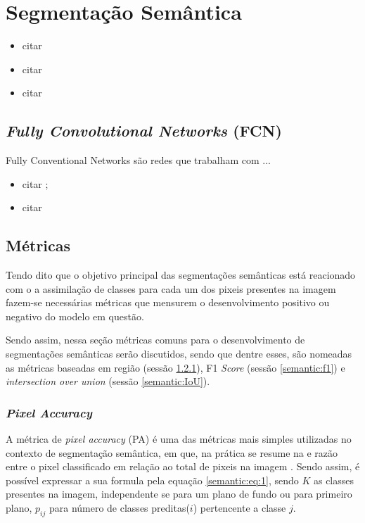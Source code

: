 \clearpage
\newpage
\section{Segmentação Semântica}
\label{semantic:semantic}
\begin{itemize}
    \item citar \cite{Minaee2021}
    \item citar \cite{Arbelaez2012}
    \item citar \cite{Zhang2018}
\end{itemize}


\subsection{\textit{Fully Convolutional Networks} (FCN)}
\label{semantic:FCN}
Fully Conventional Networks são redes que trabalham com ... 
\begin{itemize}
    \item citar \cite{Shelhamer2016};
    \item citar \cite{Minaee2021}
\end{itemize}


\subsection{Métricas}

Tendo dito que o objetivo principal das segmentações semânticas está reacionado com o a assimilação de classes para cada um dos pixeis presentes na imagem \cite{Csurka} fazem-se necessárias métricas que mensurem o desenvolvimento positivo ou negativo do modelo em questão.

Sendo assim, nessa seção métricas comuns para o desenvolvimento de segmentações semânticas serão discutidos, sendo que dentre esses, são nomeadas as métricas baseadas em região (sessão \ref{semantic:pa}), F1 \textit{Score} (sessão \ref{semantic:f1}) e \textit{intersection over union} (sessão \ref{semantic:IoU}).


\subsubsection{\textit{Pixel Accuracy}}
\label{semantic:pa}

A métrica de \textit{pixel accuracy} (PA) é uma das métricas mais simples utilizadas no contexto de segmentação semântica, em que, na prática se resume na e razão entre o pixel classificado em relação ao total de pixeis na imagem \cite{Minaee2021}. Sendo assim, é possível expressar a sua formula pela equação \ref{semantic:eq:1}, sendo $K$ as classes presentes na imagem, independente se para um plano de fundo ou para primeiro plano, $p_{ij}$ para número de classes preditas($i$) pertencente a classe $j$.

